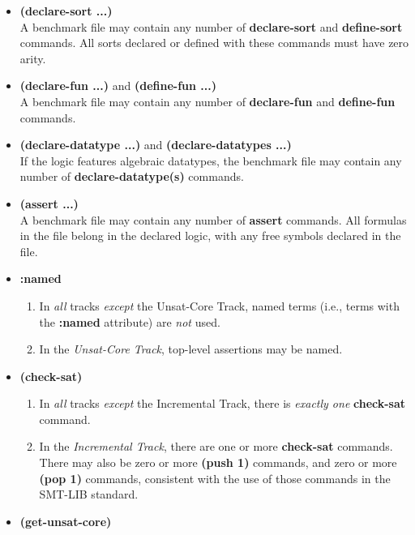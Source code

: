 \documentclass[12pt]{article}
\newcommand{\akey}[1]{\textbf{#1}\xspace}
\newcommand{\bkey}[1]{\textbf{{#1}}\xspace}
\newcommand{\inctrack}{Incremental Track\xspace}
\newcommand{\ucoretrack}{Unsat-Core Track\xspace}
\begin{document}
\begin{itemize}
\begin{enumerate}[label=(\alph*)]
        \akey{(set-option :produce-unsat-cores true)} command.
    \end{enumerate}
  \item \bkey{(declare-sort ...)}\\
    A benchmark file may contain any number of \akey{declare-sort} and
    \akey{define-sort} commands.  All sorts declared or defined with these
    commands must have zero arity.
  \item \bkey{(declare-fun ...)} and \bkey{(define-fun ...)}\\
    A benchmark file may contain any number of \akey{declare-fun} and
    \akey{define-fun} commands.
  \item \bkey{(declare-datatype ...)} and \bkey{(declare-datatypes ...)}\\
    If the logic features algebraic datatypes, the benchmark file may
    contain any number of \akey{declare-datatype(s)} commands.
  \item \bkey{(assert ...)}\\
    A benchmark file may contain any number of \akey{assert} commands.  All
    formulas in the file belong in the declared logic, with any free symbols
    declared in the file.
  \item
    \bkey{:named}
    \begin{enumerate}[label=(\alph*)]
      \vspace{-1ex}
      \item In \emph{all} tracks \emph{except} the \ucoretrack,  named
        terms (i.e., terms with the \akey{:named} attribute) are \emph{not}
        used.
      \item In the \emph{\ucoretrack}, top-level assertions may be named.
    \end{enumerate}
    \item
      \bkey{(check-sat)}
      \begin{enumerate}[label=(\alph*)]
        \vspace{-1ex}
        \item In \emph{all} tracks \emph{except} the \inctrack, there is
          \emph{exactly one} \akey{check-sat} command.
        \item In the \emph{\inctrack}, there are one or more
        \akey{check-sat} commands.  There may also be zero or more
        \akey{(push 1)} commands, and zero or more \akey{(pop 1)} commands,
        consistent with the use of those commands in the SMT-LIB standard.
    \end{enumerate}
    \item \bkey{(get-unsat-core)}\\

\end{itemize}
\end{document}
